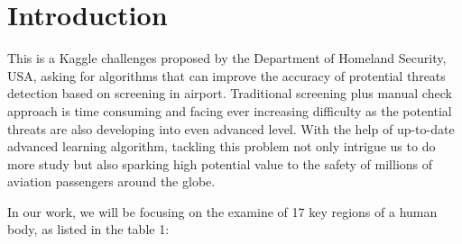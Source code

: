 \documentclass[conference,compsoc]{IEEEtran}
\begin{document}
\section{Introduction}
	\par
	This is a Kaggle challenges proposed by the Department of Homeland Security, USA, asking for algorithms that can improve the accuracy of protential threats detection based on screening in airport. Traditional screening plus manual check approach is time consuming and facing ever increasing difficulty as the potential threats are also developing into even advanced level. With the help of up-to-date advanced learning algorithm, tackling this problem not only intrigue us to do more study but also sparking high potential value to the safety of millions of aviation passengers around the globe.
	\par
	In our work, we will be focusing on the examine of 17 key regions of a human body, as listed in the table 1:
\end{document}
